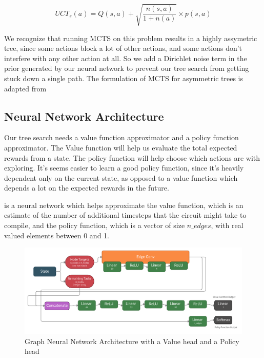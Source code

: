 \documentclass[%
 reprint,
 amsmath,amssymb,
 aps,
]{revtex4-2}
\begin{document}
\begin{equation}
    UCT_s(a) = Q(s, a) + \sqrt{\frac{n(s, a)}{1 + n(a)}} \times p(s, a)
\end{equation}

We recognize that running MCTS on this problem results in a highly assymetric tree, since some actions block a lot of other actions, and some actions don't interfere with any other action at all. So we add a Dirichlet noise term in the prior generated by our neural network to prevent our tree search from getting stuck down a single path. The formulation of MCTS for asymmetric trees is adapted from \citet{mcts_assymetric}

\subsection{\label{sec:method-architecture}Neural Network Architecture}

Our tree search needs a value function approximator and a policy function approximator. The Value function will help us evaluate the total expected rewards from a state. The policy function will help choose which actions are with exploring. It's seems easier to learn a good policy function, since it's heavily dependent only on the current state, as opposed to a value function which depends a lot on the expected rewards in the future.

is a neural network which helps approximate the value function, which is an estimate of the number of additional timesteps that the circuit might take to compile, and the policy function, which is a vector of size $n\_edges$, with real valued elements between 0 and 1.

\begin{figure}[btp]
    \includegraphics[width=\textwidth]{images/network-architecture.jpg}
    \caption{\label{fig:network-architecture}
        Graph Neural Network Architecture with a Value head and a Policy head}
\end{figure}
\end{document}
